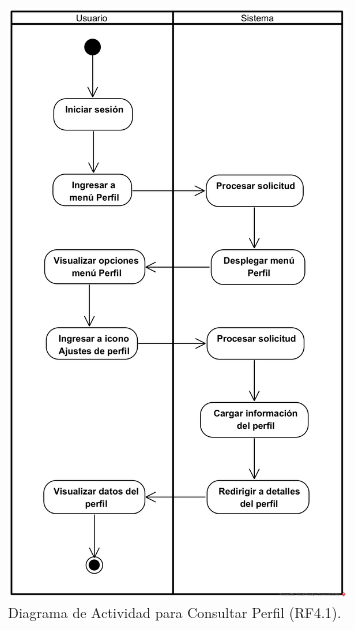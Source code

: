 \begin{figure}[H]
	\centering
		\caption{Diagrama de Actividad para Consultar Perfil (RF4.1).}
	\includegraphics[width=0.8\textwidth]{UML/Actividad/Diagrama de Actividad RF4.1 Consultar Perfil.png}
\end{figure}


